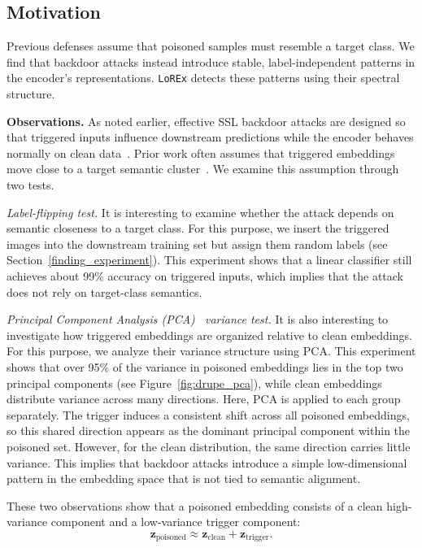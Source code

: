 \documentclass[letterpaper,twocolumn,10pt]{article}
\begin{document}
\subsection{Motivation}
\label{motivation}
Previous defenses assume that poisoned samples must resemble a target class. We find that backdoor attacks instead introduce stable, label-independent patterns in the encoder's representations. \texttt{LoREx} detects these patterns using their spectral structure.


\par \textbf{Observations.}
As noted earlier, effective SSL backdoor attacks are designed so that triggered inputs influence downstream predictions while the encoder behaves normally on clean data~\cite{abbasi2025backdoorattacksdefensescomputer}. Prior work often assumes that triggered embeddings move close to a target semantic cluster~\cite{hou2025dede,asset,tao2024distribution}. We examine this assumption through two tests.


\textit{Label-flipping test.} It is interesting to examine whether the attack depends on semantic closeness to a target class. For this purpose, we insert the triggered images into the downstream training set but assign them random labels (see Section~\ref{finding_experiment}). This experiment shows that a linear classifier still achieves about 99\% accuracy on triggered inputs, which implies that the attack does not rely on target-class semantics.


\textit{Principal Component Analysis (PCA)~\cite{pca} variance test.} It is also interesting to investigate how triggered embeddings are organized relative to clean embeddings. For this purpose, we analyze their variance structure using PCA. This experiment shows that over 95\% of the variance in poisoned embeddings lies in the top two principal components (see Figure~\ref{fig:drupe_pca}), while clean embeddings distribute variance across many directions. Here, PCA is applied to each group separately. The trigger induces a consistent shift across all poisoned embeddings, so this shared direction appears as the dominant principal component within the poisoned set. However, for the clean distribution, the same direction carries little variance. This implies that backdoor attacks introduce a simple low-dimensional pattern in the embedding space that is not tied to semantic alignment.


\par These two observations show that a poisoned embedding consists of a clean high-variance component and a low-variance trigger component:
\begin{equation}
    \mathbf{z}_{\text{poisoned}} \approx \mathbf{z}_{\text{clean}} + \mathbf{z}_{\text{trigger}}.
\end{equation}
\end{document}
